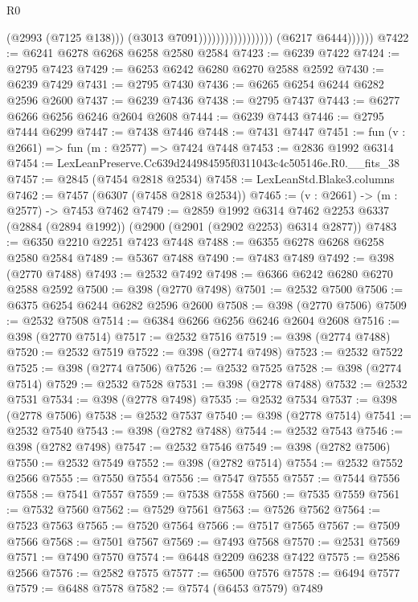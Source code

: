 \begin{lexlean}{R0}
\begin{coremodule}
                                                (@2993 (@7125 @138)))
                                              (@3013 @7091)))))))))))))))))
              (@6217 @6444))))))
@7422 := @6241 @6278 @6268 @6258 @2580 @2584
@7423 := @6239 @7422
@7424 := @2795 @7423
@7429 := @6253 @6242 @6280 @6270 @2588 @2592
@7430 := @6239 @7429
@7431 := @2795 @7430
@7436 := @6265 @6254 @6244 @6282 @2596 @2600
@7437 := @6239 @7436
@7438 := @2795 @7437
@7443 := @6277 @6266 @6256 @6246 @2604 @2608
@7444 := @6239 @7443
@7446 := @2795 @7444 @6299
@7447 := @7438 @7446
@7448 := @7431 @7447
@7451 := fun (v : @2661) => fun (m : @2577) => @7424 @7448
@7453 := @2836 @1992 @6314
@7454 := LexLeanPreserve.Cc639d244984595f0311043c4c505146e.R0.__fits_38
@7457 := @2845 (@7454 @2818 @2534)
@7458 := LexLeanStd.Blake3.columns
@7462 := @7457 (@6307 (@7458 @2818 @2534))
@7465 := (v : @2661) -> (m : @2577) -> @7453 @7462
@7479 := @2859
    @1992
    @6314
    @7462
    @2253
    @6337
    (@2884 (@2894 @1992))
    (@2900 (@2901 (@2902 @2253) @6314 @2877))
@7483 := @6350 @2210 @2251 @7423 @7448
@7488 := @6355 @6278 @6268 @6258 @2580 @2584
@7489 := @5367 @7488
@7490 := @7483 @7489
@7492 := @398 (@2770 @7488)
@7493 := @2532 @7492
@7498 := @6366 @6242 @6280 @6270 @2588 @2592
@7500 := @398 (@2770 @7498)
@7501 := @2532 @7500
@7506 := @6375 @6254 @6244 @6282 @2596 @2600
@7508 := @398 (@2770 @7506)
@7509 := @2532 @7508
@7514 := @6384 @6266 @6256 @6246 @2604 @2608
@7516 := @398 (@2770 @7514)
@7517 := @2532 @7516
@7519 := @398 (@2774 @7488)
@7520 := @2532 @7519
@7522 := @398 (@2774 @7498)
@7523 := @2532 @7522
@7525 := @398 (@2774 @7506)
@7526 := @2532 @7525
@7528 := @398 (@2774 @7514)
@7529 := @2532 @7528
@7531 := @398 (@2778 @7488)
@7532 := @2532 @7531
@7534 := @398 (@2778 @7498)
@7535 := @2532 @7534
@7537 := @398 (@2778 @7506)
@7538 := @2532 @7537
@7540 := @398 (@2778 @7514)
@7541 := @2532 @7540
@7543 := @398 (@2782 @7488)
@7544 := @2532 @7543
@7546 := @398 (@2782 @7498)
@7547 := @2532 @7546
@7549 := @398 (@2782 @7506)
@7550 := @2532 @7549
@7552 := @398 (@2782 @7514)
@7554 := @2532 @7552 @2566
@7555 := @7550 @7554
@7556 := @7547 @7555
@7557 := @7544 @7556
@7558 := @7541 @7557
@7559 := @7538 @7558
@7560 := @7535 @7559
@7561 := @7532 @7560
@7562 := @7529 @7561
@7563 := @7526 @7562
@7564 := @7523 @7563
@7565 := @7520 @7564
@7566 := @7517 @7565
@7567 := @7509 @7566
@7568 := @7501 @7567
@7569 := @7493 @7568
@7570 := @2531 @7569
@7571 := @7490 @7570
@7574 := @6448 @2209 @6238 @7422
@7575 := @2586 @2566
@7576 := @2582 @7575
@7577 := @6500 @7576
@7578 := @6494 @7577
@7579 := @6488 @7578
@7582 := @7574 (@6453 @7579) @7489

\end{coremodule}
\end{lexlean}
